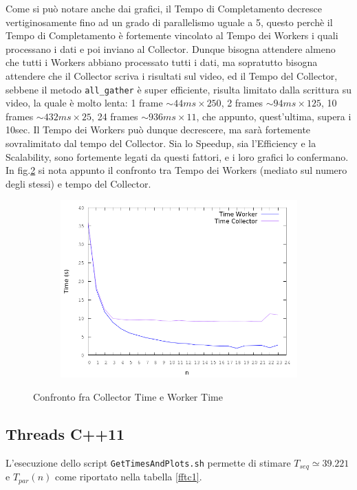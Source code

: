 \documentclass[12pt]{article}
\begin{document}
Come si pu\`o notare anche dai grafici, il Tempo di Completamento decresce vertiginosamente fino ad un grado di parallelismo uguale a 5, questo perch\`e il Tempo di Completamento \`e fortemente vincolato al Tempo dei Workers i quali processano i dati e poi inviano al Collector. Dunque bisogna attendere almeno che tutti i Workers abbiano processato tutti i dati, ma sopratutto bisogna attendere che il Collector scriva i risultati sul video, ed il Tempo del Collector, sebbene il metodo \texttt{all\_gather} \`e super efficiente, risulta limitato dalla scrittura su video, la quale \`e molto lenta: 1 frame $\sim 44ms \times 250$, 2 frames $\sim 94ms \times 125$, 10 frames $\sim 432ms \times 25$, 24 frames $\sim 936ms \times 11$, che appunto, quest'ultima, supera i 10sec. Il Tempo dei Workers pu\`o dunque decrescere, ma sar\`a fortemente sovralimitato dal tempo del Collector. Sia lo Speedup, sia l'Efficiency e la Scalability, sono fortemente legati da questi fattori, e i loro grafici lo confermano. In fig.\ref{img:evidence} si nota appunto il confronto tra Tempo dei Workers (mediato sul numero degli stessi) e tempo del Collector.
\begin{figure}[!htbp]
\begin{subfigure}{.55\textwidth}
  \centering
  \includegraphics[scale=.55,keepaspectratio]{ff_evidence_time.png}
  \caption{}
  \label{fig:tisc}
\end{subfigure} 
\caption{Confronto fra Collector Time e Worker Time}
\label{img:evidence}
\end{figure}

\subsection{Threads C++11}
L'esecuzione dello script \texttt{GetTimesAndPlots.sh} permette di stimare $T_{seq} \simeq 39.221$ e $T_{par}(n)$ come riportato nella tabella \ref{fftc1}.
\end{document}
